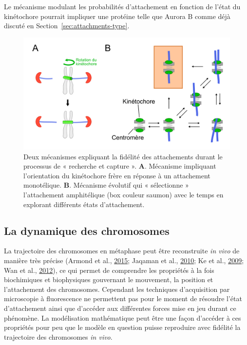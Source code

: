 \documentclass[12pt,a4paper,twoside,openright]{book}
\begin{document}
Le mécanisme modulant les probabilités d'attachement en fonction de
l'état du kinétochore pourrait impliquer une protéine telle que Aurora B
comme déjà discuté en Section~\ref{sec:attachments-type}.

\begin{figure}[htbp]
\centering
\includegraphics{figures/intro/spindle_assembly.png}
\caption[Deux mécanismes de l'assemblage du fuseau mitotique]{\label{fig:spindle_assembly}Deux
mécanismes expliquant la fidélité des attachements durant le processus
de « recherche et capture ». \textbf{A}. Mécanisme impliquant
l'orientation du kinétochore frère en réponse à un attachement
monotélique. \textbf{B}. Mécanisme évolutif qui « sélectionne »
l'attachement amphitélique (box couleur saumon) avec le temps en
explorant différents états d'attachement.}
\end{figure}

\subsection{La dynamique des
chromosomes}\label{la-dynamique-des-chromosomes}

\label{sec:force-gen}

La trajectoire des chromosomes en métaphase peut être reconstruite
\emph{in vivo} de manière très précise (Armond et al.,
\hyperref[ref-Armond2015]{2015}; Jaqaman et al.,
\hyperref[ref-Jaqaman2010]{2010}; Ke et al.,
\hyperref[ref-Ke2009]{2009}; Wan et al., \hyperref[ref-Wan2012]{2012}),
ce qui permet de comprendre les propriétés à la fois biochimiques et
biophysiques gouvernant le mouvement, la position et l'attachement des
chromosomes. Cependant les techniques d'acquisition par microscopie à
fluorescence ne permettent pas pour le moment de résoudre l'état
d'attachement ainsi que d'accéder aux différentes forces mise en jeu
durant ce phénomène. La modélisation mathématique peut être une façon
d'accéder à ces propriétés pour peu que le modèle en question puisse
reproduire avec fidélité la trajectoire des chromosomes \emph{in vivo}.
\end{document}
